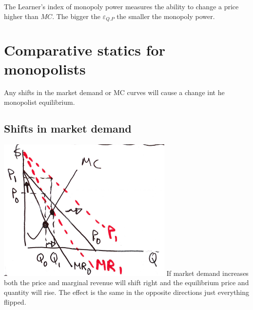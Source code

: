 \documentclass[../ECON-281-Notes.tex]{subfiles}
\begin{document}
The Learner's index of monopoly power measures the ability to change a price higher than $MC$.
The bigger the $\varepsilon_{Q.P}$ the smaller the monopoly power.


\section{Comparative statics for monopolists}
Any shifts in the market demand or MC curves will cause a change int he monopolist equilibrium.

\subsection{Shifts in market demand}
\includegraphics[width=\columnwidth]{assets/image_2021-11-29-22-52-41.png}
If market demand increases both the price and marginal revenue will shift right and the equilibrium price and quantity will rise.
The effect is the same in the opposite directions just everything flipped.
\end{document}
